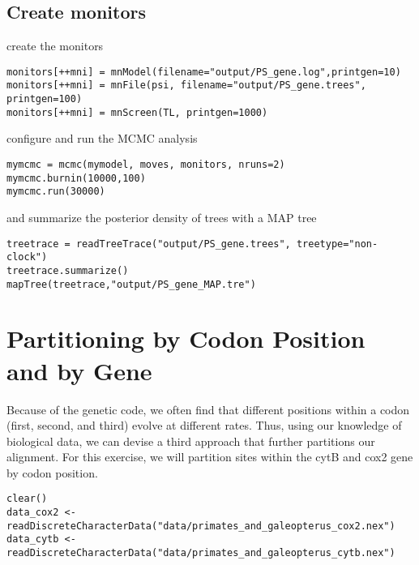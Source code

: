 \subsection{Create monitors}

create the monitors

{\tt \begin{snugshade*}
\begin{lstlisting}
monitors[++mni] = mnModel(filename="output/PS_gene.log",printgen=10)
monitors[++mni] = mnFile(psi, filename="output/PS_gene.trees", printgen=100)
monitors[++mni] = mnScreen(TL, printgen=1000)
\end{lstlisting}
\end{snugshade*}}

configure and run the MCMC analysis

{\tt \begin{snugshade*}
\begin{lstlisting}
mymcmc = mcmc(mymodel, moves, monitors, nruns=2)
mymcmc.burnin(10000,100)
mymcmc.run(30000)
\end{lstlisting}
\end{snugshade*}}

and summarize the posterior density of trees with a MAP tree

{\tt \begin{snugshade*}
\begin{lstlisting}
treetrace = readTreeTrace("output/PS_gene.trees", treetype="non-clock")
treetrace.summarize()
mapTree(treetrace,"output/PS_gene_MAP.tre")
\end{lstlisting}
\end{snugshade*}}



\section{Partitioning by Codon Position and by Gene}\label{secExtremeP}

Because of the genetic code, we often find that different positions within a codon (first, second, and third) evolve at different rates.
Thus, using our knowledge of biological data, we can devise a third approach that further partitions our alignment. 
For this exercise, we will partition sites within the cytB and cox2 gene by codon position.

{\tt \begin{snugshade*}
\begin{lstlisting}
clear()
data_cox2 <- readDiscreteCharacterData("data/primates_and_galeopterus_cox2.nex")
data_cytb <- readDiscreteCharacterData("data/primates_and_galeopterus_cytb.nex")
\end{lstlisting}
\end{snugshade*}}

